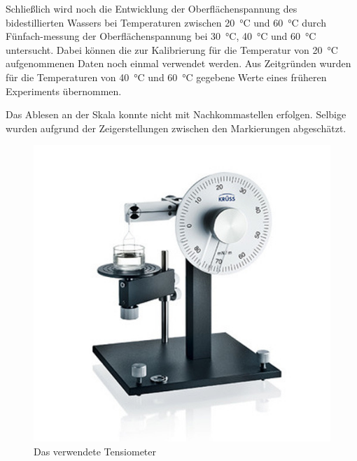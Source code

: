Schließlich wird noch die Entwicklung der Oberflächenspannung des bidestillierten Wassers bei Temperaturen zwischen \SI{20}{\degreeCelsius} und \SI{60}{\degreeCelsius} durch Fünfach-messung der Oberflächenspannung bei \SI{30}{\degreeCelsius}, \SI{40}{\degreeCelsius} und \SI{60}{\degreeCelsius} untersucht. Dabei können die zur Kalibrierung für die Temperatur von \SI{20}{\degreeCelsius} aufgenommenen Daten noch einmal verwendet werden. Aus Zeitgründen wurden für die Temperaturen von \SI{40}{\degreeCelsius} und \SI{60}{\degreeCelsius} gegebene Werte eines früheren Experiments übernommen.

Das Ablesen an der Skala konnte nicht mit Nachkommastellen erfolgen. Selbige wurden aufgrund der Zeigerstellungen zwischen den Markierungen abgeschätzt.




\begin{figure}[h!]
\centering
\includegraphics[width=0.7\linewidth]{img/tensiometer}
\caption{Das verwendete Tensiometer}
\label{fig:versuchsaufbau-ebull}
\end{figure}

